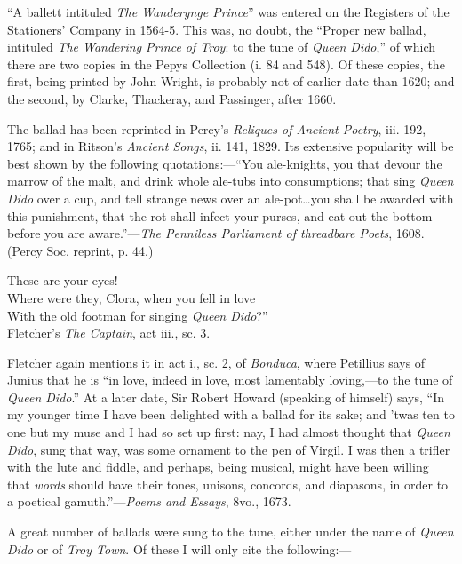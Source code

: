 
“A ballett intituled \textit{The Wanderynge Prince}” was entered on the Registers
of the Stationers’ Company in 1564-5. This was, no doubt, the “Proper new
ballad, intituled \textit{The Wandering Prince of Troy}: to the tune of \textit{Queen Dido},” of
which there are two copies in the Pepys Collection (i. 84 and 548). Of these
copies, the first, being printed by John Wright, is probably not of earlier date
than 1620; and the second, by Clarke, Thackeray, and Passinger, after 1660.

The ballad has been reprinted in Percy’s \textit{Reliques of Ancient Poetry}, iii. 192,
1765; and in Ritson’s \textit{Ancient Songs}, ii. 141, 1829. Its extensive popularity
will be best shown by the following quotations:—“You ale-knights, you that
devour the marrow of the malt, and drink whole ale-tubs into consumptions; that
\pagebreak%
sing \textit{Queen Dido} over a cup, and tell strange news over an ale-pot\ldots you shall be
awarded with this punishment, that the rot shall infect your purses, and eat out
the bottom before you are aware.”—\textit{The Penniless Parliament of threadbare
Poets}, 1608. (Percy Soc. reprint, p. 44.)
\begin{scverse}
These are your eyes!\\
Where were they, Clora, when you fell in love\\
With the old footman for singing \textit{Queen Dido}?”\\
\attribution Fletcher’s \textit{The Captain}, act iii., sc. 3.
\end{scverse}
Fletcher again mentions it in act i., sc. 2, of \textit{Bonduca}, where Petillius says of
Junius that he is “in love, indeed in love, most lamentably loving,—to the tune
of \textit{Queen Dido}.” At a later date, Sir Robert Howard (speaking of himself)
says, “In my younger time I have been delighted with a ballad for its sake;
and ’twas ten to one but my muse and I had so set up first: nay, I had almost
thought that \textit{Queen Dido}, sung that way, was some ornament to the pen of Virgil.
I was then a trifler with the lute and fiddle, and perhaps, being musical, might
have been willing that \textit{words} should have their tones, unisons, concords, and
diapasons, in order to a poetical gamuth.”—\textit{Poems and Essays}, 8vo., 1673.

A great number of ballads were sung to the tune, either under the name of
\textit{Queen Dido} or of \textit{Troy Town}. Of these I will only cite the following:—

